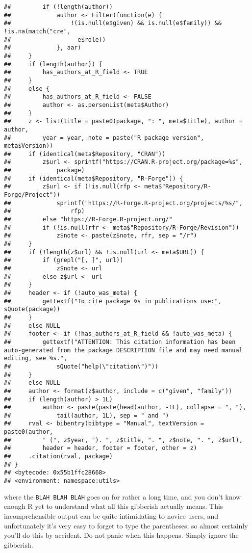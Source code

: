 \documentclass[]{book}
\begin{document}
\begin{verbatim}
##         if (!length(author)) 
##             author <- Filter(function(e) {
##                 !(is.null(e$given) && is.null(e$family)) && !is.na(match("cre", 
##                   e$role))
##             }, aar)
##     }
##     if (length(author)) {
##         has_authors_at_R_field <- TRUE
##     }
##     else {
##         has_authors_at_R_field <- FALSE
##         author <- as.personList(meta$Author)
##     }
##     z <- list(title = paste0(package, ": ", meta$Title), author = author, 
##         year = year, note = paste("R package version", meta$Version))
##     if (identical(meta$Repository, "CRAN")) 
##         z$url <- sprintf("https://CRAN.R-project.org/package=%s", 
##             package)
##     if (identical(meta$Repository, "R-Forge")) {
##         z$url <- if (!is.null(rfp <- meta$"Repository/R-Forge/Project")) 
##             sprintf("https://R-Forge.R-project.org/projects/%s/", 
##                 rfp)
##         else "https://R-Forge.R-project.org/"
##         if (!is.null(rfr <- meta$"Repository/R-Forge/Revision")) 
##             z$note <- paste(z$note, rfr, sep = "/r")
##     }
##     if (!length(z$url) && !is.null(url <- meta$URL)) {
##         if (grepl("[, ]", url)) 
##             z$note <- url
##         else z$url <- url
##     }
##     header <- if (!auto_was_meta) {
##         gettextf("To cite package %s in publications use:", sQuote(package))
##     }
##     else NULL
##     footer <- if (!has_authors_at_R_field && !auto_was_meta) {
##         gettextf("ATTENTION: This citation information has been auto-generated from the package DESCRIPTION file and may need manual editing, see %s.", 
##             sQuote("help(\"citation\")"))
##     }
##     else NULL
##     author <- format(z$author, include = c("given", "family"))
##     if (length(author) > 1L) 
##         author <- paste(paste(head(author, -1L), collapse = ", "), 
##             tail(author, 1L), sep = " and ")
##     rval <- bibentry(bibtype = "Manual", textVersion = paste0(author, 
##         " (", z$year, "). ", z$title, ". ", z$note, ". ", z$url), 
##         header = header, footer = footer, other = z)
##     .citation(rval, package)
## }
## <bytecode: 0x55b1ffc28668>
## <environment: namespace:utils>
\end{verbatim}

where the \texttt{BLAH\ BLAH\ BLAH} goes on for rather a long time, and you don't know enough R yet to understand what all this gibberish actually means. This incomprehensible output can be quite intimidating to novice users, and unfortunately it's very easy to forget to type the parentheses; so almost certainly you'll do this by accident. Do not panic when this happens. Simply ignore the gibberish.
\end{document}
